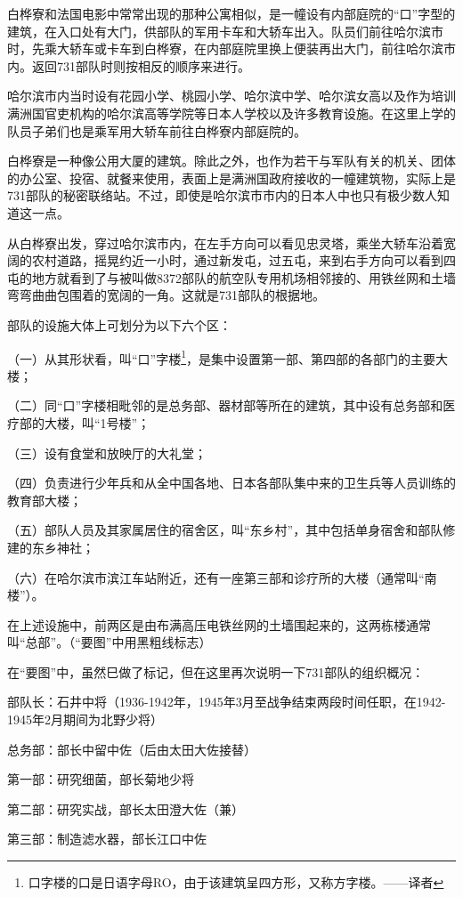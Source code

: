 \documentclass[a4paper,12pt,UTF8,twoside]{ctexbook}
\begin{document}
白桦寮和法国电影中常常出现的那种公寓相似，是一幢设有内部庭院的“口”字型的建筑，在入口处有大门，供部队的军用卡车和大轿车出入。队员们前往哈尔滨市时，先乘大轿车或卡车到白桦寮，在内部庭院里换上便装再出大门，前往哈尔滨市内。返回731部队时则按相反的顺序来进行。

哈尔滨市内当时设有花园小学、桃园小学、哈尔滨中学、哈尔滨女高以及作为培训满洲国官吏机构的哈尔滨高等学院等日本人学校以及许多教育设施。在这里上学的队员子弟们也是乘军用大轿车前往白桦寮内部庭院的。

白桦寮是一种像公用大厦的建筑。除此之外，也作为若干与军队有关的机关、团体的办公室、投宿、就餐来使用，表面上是满洲国政府接收的一幢建筑物，实际上是731部队的秘密联络站。不过，即使是哈尔滨市市内的日本人中也只有极少数人知道这一点。

从白桦寮出发，穿过哈尔滨市内，在左手方向可以看见忠灵塔，乘坐大轿车沿着宽阔的农村道路，摇晃约近一小时，通过新发屯，过五屯，来到右手方向可以看到四屯的地方就看到了与被叫做8372部队的航空队专用机场相邻接的、用铁丝网和土墙弯弯曲曲包围着的宽阔的一角。这就是731部队的根据地。

部队的设施大体上可划分为以下六个区：

（一）从其形状看，叫“口”字楼\footnote{口字楼的口是日语字母RO，由于该建筑呈四方形，又称方字楼。——译者}，是集中设置第一部、第四部的各部门的主要大楼；

（二）同“口”字楼相毗邻的是总务部、器材部等所在的建筑，其中设有总务部和医疗部的大楼，叫“1号楼”；

（三）设有食堂和放映厅的大礼堂；

（四）负责进行少年兵和从全中国各地、日本各部队集中来的卫生兵等人员训练的教育部大楼；

（五）部队人员及其家属居住的宿舍区，叫“东乡村”，其中包括单身宿舍和部队修建的东乡神社；

（六）在哈尔滨市滨江车站附近，还有一座第三部和诊疗所的大楼（通常叫“南楼”）。

在上述设施中，前两区是由布满高压电铁丝网的土墙围起来的，这两栋楼通常叫“总部”。（“要图”中用黑粗线标志）

在“要图”中，虽然巳做了标记，但在这里再次说明一下731部队的组织概况：

部队长：石井中将（1936-1942年，1945年3月至战争结束两段时间任职，在1942-1945年2月期间为北野少将）

总务部：部长中留中佐（后由太田大佐接替）

第一部：研究细菌，部长菊地少将

第二部：研究实战，部长太田澄大佐（兼）

第三部：制造滤水器，部长江口中佐
\end{document}
